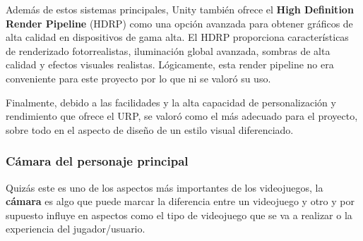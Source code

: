 Además de estos sistemas principales, Unity también ofrece el \textbf{High Definition Render Pipeline} (HDRP) como una opción avanzada para obtener gráficos de alta calidad en dispositivos de gama alta. El HDRP proporciona características de renderizado fotorrealistas, iluminación global avanzada, sombras de alta calidad y efectos visuales realistas. Lógicamente, esta render pipeline no era conveniente para este proyecto por lo que ni se valoró su uso.

Finalmente, debido a las facilidades y la alta capacidad de personalización y rendimiento que ofrece el URP, se valoró como el más adecuado para el proyecto, sobre todo en el aspecto de diseño de un estilo visual diferenciado.

\subsubsection{Cámara del personaje principal} 

Quizás este es uno de los aspectos más importantes de los videojuegos, la \textbf{cámara} es algo
que puede marcar la diferencia entre un videojuego y otro y por supuesto influye en aspectos como
el tipo de videojuego que se va a realizar o la experiencia del jugador/usuario.\\


